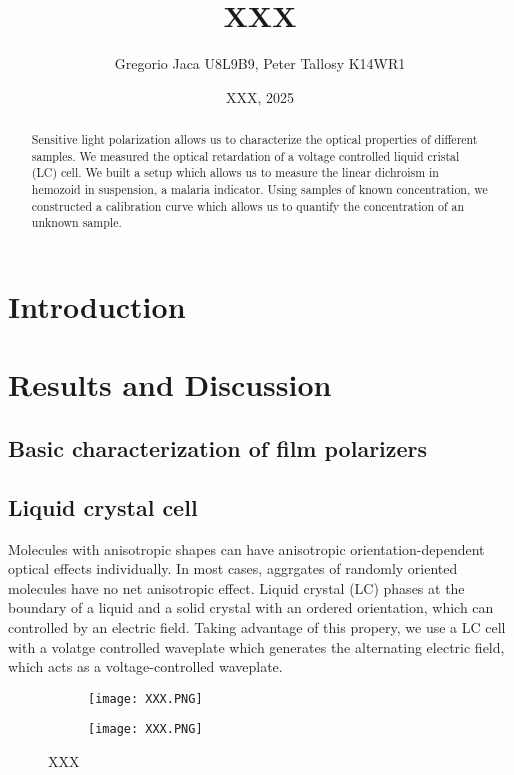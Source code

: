 \documentclass[12pt,a4paper]{article}
\title{XXX}
\author{Gregorio Jaca U8L9B9, Peter Tallosy K14WR1 }
\date{XXX, 2025}
\begin{document}
\maketitle

\begin{abstract}

    Sensitive light polarization allows us to characterize the optical properties of different samples.
    We measured the optical retardation of a voltage controlled liquid cristal (LC) cell. We built a setup which allows us to measure the linear dichroism in hemozoid in suspension, a malaria indicator. Using samples of known concentration, we constructed a calibration curve which allows us to quantify the concentration of an unknown sample.

\end{abstract}

\section{Introduction}



\section{Results and Discussion}

\subsection{Basic characterization of film polarizers}

\subsection{Liquid crystal cell}

Molecules with anisotropic shapes can have anisotropic orientation-dependent optical effects individually. In most cases, aggrgates of randomly oriented molecules have no net anisotropic effect. Liquid crystal (LC) phases at the boundary of a liquid and a solid crystal with an ordered orientation, which can controlled by an electric field. Taking advantage of this propery, we use a LC cell with a volatge controlled waveplate which generates the alternating electric field, which acts as a voltage-controlled waveplate.

\begin{figure}[H]
    \centering
    \begin{subfigure}{\linewidth}
        \centering
        \texttt{[image: XXX.PNG]}
    \end{subfigure}
    
    \vspace{1em} %

    \begin{subfigure}{\linewidth}
        \centering
        \texttt{[image: XXX.PNG]}
    \end{subfigure}
    
    \caption{XXX}
    \label{fig:XXX}
\end{figure}
\end{document}
